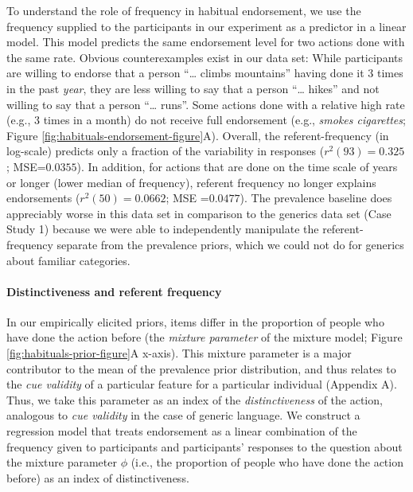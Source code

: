 \documentclass[english,,man,floatsintext]{apa6}
\let\oldparagraph\paragraph
\renewcommand{\paragraph}[1]{\oldparagraph{#1}\mbox{}}
\theoremstyle{definition}
\theoremstyle{definition}
\theoremstyle{definition}
\theoremstyle{remark}
\begin{document}
To understand the role of frequency in habitual endorsement, we use the
frequency supplied to the participants in our experiment as a predictor
in a linear model. This model predicts the same endorsement level for
two actions done with the same rate. Obvious counterexamples exist in
our data set: While participants are willing to endorse that a person
\enquote{\ldots{} climbs mountains} having done it 3 times in the past
\emph{year}, they are less willing to say that a person
\enquote{\ldots{} hikes} and not willing to say that a person
\enquote{\ldots{} runs}. Some actions done with a relative high rate
(e.g., 3 times in a month) do not receive full endorsement (e.g.,
\emph{smokes cigarettes}; Figure
\ref{fig:habituals-endorsement-figure}A). Overall, the
referent-frequency (in log-scale) predicts only a fraction of the
variability in responses (\(r^2(93) = 0.325\); MSE=\(0.0355\)). In
addition, for actions that are done on the time scale of years or longer
(lower median of frequency), referent frequency no longer explains
endorsements (\(r^2(50) = 0.0662\); MSE =\(0.0477\)). The prevalence
baseline does appreciably worse in this data set in comparison to the
generics data set (Case Study 1) because we were able to independently
manipulate the referent-frequency separate from the prevalence priors,
which we could not do for generics about familiar categories.

\hypertarget{distinctiveness-and-referent-frequency}{%
\paragraph{Distinctiveness and referent
frequency}\label{distinctiveness-and-referent-frequency}}

In our empirically elicited priors, items differ in the proportion of
people who have done the action before (the \emph{mixture parameter} of
the mixture model; Figure \ref{fig:habituals-prior-figure}A x-axis).
This mixture parameter is a major contributor to the mean of the
prevalence prior distribution, and thus relates to the \emph{cue
validity} of a particular feature for a particular individual (Appendix
A). Thus, we take this parameter as an index of the
\emph{distinctiveness} of the action, analogous to \emph{cue validity}
in the case of generic language. We construct a regression model that
treats endorsement as a linear combination of the frequency given to
participants and participants' responses to the question about the
mixture parameter \(\phi\) (i.e., the proportion of people who have done
the action before) as an index of distinctiveness.
\end{document}
